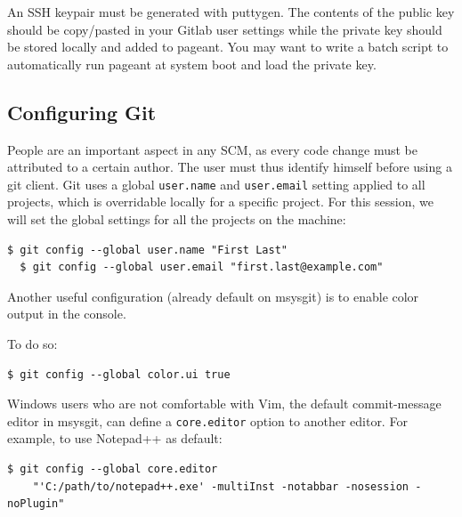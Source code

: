 \documentclass{tufte-handout}
\begin{document}
An SSH keypair must be generated with puttygen.
The contents of the public key should be copy/pasted in your Gitlab user settings while the private key should be stored locally and added to pageant. 
You may want to write a batch script to automatically run pageant at system boot and load the private key.

\subsection{Configuring Git}

People are an important aspect in any SCM, as every code change must be attributed to a certain author.
The user must thus identify himself before using a git client.
Git uses a global \texttt{user.name} and \texttt{user.email} setting applied to all projects, which is overridable locally for a specific project.
For this session, we will set the global settings for all the projects on the machine:

\begin{lstlisting}[style=BashInputStyle]
  $ git config --global user.name "First Last"
  $ git config --global user.email "first.last@example.com"
\end{lstlisting}

Another useful configuration (already default on msysgit) is to enable color output in the console.

\noindent To do so:

\begin{lstlisting}[style=BashInputStyle]
  $ git config --global color.ui true
\end{lstlisting}

Windows users who are not comfortable with Vim, the default commit-message editor in msysgit, can define a \texttt{core.editor} option to another editor.
For example, to use Notepad++ as default:

\begin{lstlisting}[style=BashInputStyle]
  $ git config --global core.editor
    "'C:/path/to/notepad++.exe' -multiInst -notabbar -nosession -noPlugin"
\end{lstlisting}
\end{document}

